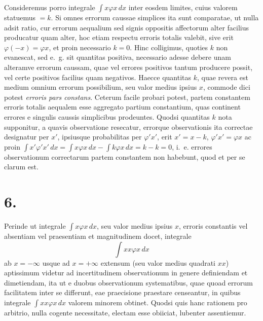\documentclass[12pt,a4paper]{book}
\begin{document}
Consideremus porro integrale $\int x\varphi x\,dx$ inter eosdem limites, cuius valorem statuemus $=k$. Si omnes errorum caussae simplices ita sunt comparatae, ut nulla adsit ratio, cur errorum aequalium sed signis oppositis affectorum alter facilius producatur quam alter, hoc etiam respectu erroris totalis valebit, sive erit $\varphi(-x)=\varphi x$, et proin necessario $k=0$. Hinc colligimus, quoties $k$ non evanescat, sed e.~g. sit quantitas positiva, necessario adesse debere unam alteramve errorum caussam, quae vel errores positivos tantum producere possit, vel certe positivos facilius quam negativos. Haecce quantitas $k$, quae revera est medium omnium errorum possibilium, seu valor medius ipsius $x$, commode dici potest \textit{erroris pars constans}. Ceterum facile probari potest, partem constantem erroris totalis aequalem esse aggregato partium constantium, quas continent errores e singulis caussis simplicibus prodeuntes. Quodsi quantitas $k$ nota supponitur, a quavis observatione resecatur, errorque observationis ita correctae designatur per $x'$, ipsiusque probabilitas per $\varphi'x'$, erit $x'=x-k$, $\varphi'x'=\varphi x$ ac proin $\int x'\varphi'x'\,dx=\int x\varphi x\,dx-\int k\varphi x\,dx=k-k=0$, i.~e. errores observationum correctarum partem constantem non habebunt, quod et per se clarum est.

\section*{6.}
\label{sec:art6}

Perinde ut integrale $\int x\varphi x\,dx$, seu valor medius ipsius $x$, erroris constantis vel absentiam vel praesentiam et magnitudinem docet, integrale
%
\begin{equation*}
\int xx\varphi x\,dx
\end{equation*}
ab $x=-\infty$ usque ad $x=+\infty$ extensum (seu valor medius quadrati $xx$) aptissimum videtur ad incertitudinem observationum in genere definiendam et dimetiendam, ita ut e duobus observationum systematibus, quae quoad errorum facilitatem inter se differunt, eae praecisione praestare censeantur, in quibus integrale $\int xx\varphi x\,dx$ valorem minorem obtinet. Quodsi quis hanc rationem pro arbitrio, nulla cogente necessitate, electam esse obiiciat, lubenter assentiemur.
\end{document}
